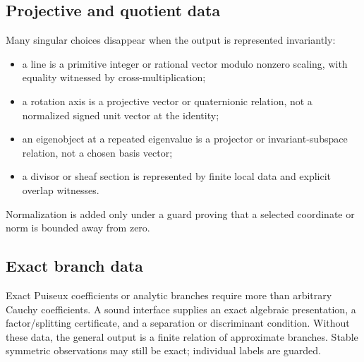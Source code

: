 \subsection{Projective and quotient data}

Many singular choices disappear when the output is represented invariantly:
\begin{itemize}
  \item a line is a primitive integer or rational vector modulo nonzero scaling, with equality witnessed by cross-multiplication;
  \item a rotation axis is a projective vector or quaternionic relation, not a normalized signed unit vector at the identity;
  \item an eigenobject at a repeated eigenvalue is a projector or invariant-subspace relation, not a chosen basis vector;
  \item a divisor or sheaf section is represented by finite local data and explicit overlap witnesses.
\end{itemize}
Normalization is added only under a guard proving that a selected coordinate or norm is bounded away from zero.

\subsection{Exact branch data}

Exact Puiseux coefficients or analytic branches require more than arbitrary Cauchy coefficients.  A sound interface supplies an exact algebraic presentation, a factor/splitting certificate, and a separation or discriminant condition.  Without these data, the general output is a finite relation of approximate branches.  Stable symmetric observations may still be exact; individual labels are guarded.
